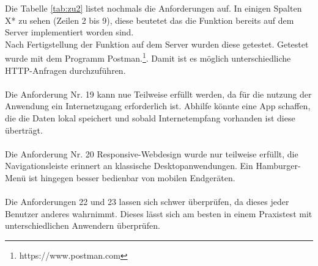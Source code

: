 Die Tabelle \ref{tab:zu2} listet nochmals die Anforderungen auf. In einigen Spalten X* zu sehen (Zeilen 2 bis 9), diese beutetet das die Funktion bereits auf dem Server implementiert worden sind. 
\\ Nach Fertigstellung der Funktion auf dem Server wurden diese getestet. Getestet wurde mit dem Programm Postman.\footnote{https://www.postman.com}. Damit ist es möglich unterschiedliche HTTP-Anfragen durchzuführen.
\\
\\
\newpage
Die Anforderung Nr. 19 kann nue Teilweise erfüllt werden, da für die nutzung der Anwendung ein Internetzugang erforderlich ist. Abhilfe könnte eine App schaffen, die die Daten lokal speichert und sobald Internetempfang vorhanden ist diese überträgt.
\\
\\
Die Anforderung Nr. 20 Responsive-Webdesign wurde nur teilweise erfüllt, die Navigationsleiste erinnert an klassische Desktopanwendungen. Ein Hamburger-Menü ist hingegen besser bedienbar von mobilen Endgeräten. 
\\
\\
Die Anforderungen 22 und 23 lassen sich schwer überprüfen, da dieses jeder Benutzer anderes wahrnimmt. Dieses lässt sich am besten in einem Praxistest mit unterschiedlichen Anwendern überprüfen. 